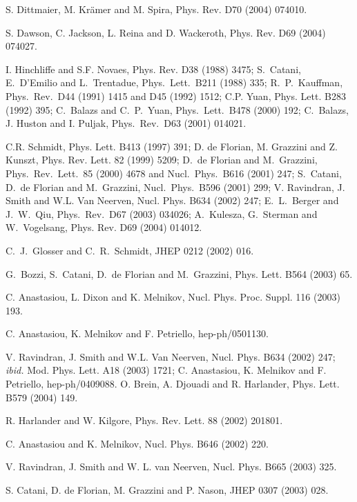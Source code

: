 \begin{thebibliography}{999}
 S. Dittmaier, M. Kr\"amer and M. Spira, Phys. Rev. D70 
(2004) 074010. 

 S. Dawson, C. Jackson, L. Reina and D. Wackeroth, Phys. Rev. 
D69 (2004) 074027.

I. Hinchliffe and S.F. Novaes, Phys. Rev. D38 (1988) 3475; 
S.~Catani, E.~D'Emilio and L.~Trentadue, Phys.\ Lett.\ B211 (1988) 335; 
R.~P.~Kauffman, Phys.\ Rev.\ D44 (1991) 1415 and D45 (1992) 1512;
C.P. Yuan, Phys. Lett. B283 (1992) 395; 
C.~Balazs and C.~P.~Yuan, Phys.\ Lett.\ B478 (2000) 192;
C.~Balazs, J. Huston and I. Puljak, Phys.\ Rev.\ D63 (2001) 014021.

 C.R. Schmidt, Phys. Lett. B413 (1997) 391; 
D. de Florian, M. Grazzini and Z. Kunszt, Phys. Rev. Lett. 82 (1999) 5209; 
D.~de Florian and M.~Grazzini, Phys.\ Rev.\ Lett.\ 85 (2000) 4678 and 
Nucl.\ Phys.\ B616 (2001) 247; S.~Catani, D.~de Florian and M.~Grazzini,
Nucl.\ Phys.\ B596 (2001) 299; V. Ravindran, J. Smith and W.L. Van Neerven, 
Nucl. Phys. B634 (2002) 247; E.~L.~Berger and J.~W.~Qiu, Phys.\ Rev.\ D67 
(2003) 034026; A.~Kulesza, G.~Sterman and W.~Vogelsang, Phys. Rev. D69 (2004) 
014012.

C.~J.~Glosser and C.~R.~Schmidt, JHEP 0212 (2002) 016.

G.~Bozzi, S.~Catani, D.~de Florian and M.~Grazzini, Phys. Lett. B564 (2003) 65.

C. Anastasiou, L. Dixon and  K. Melnikov, Nucl. Phys. Proc. Suppl. 116 (2003)
193.

C. Anastasiou,  K. Melnikov and F. Petriello, hep-ph/0501130.

 V. Ravindran, J. Smith and W.L. Van Neerven, 
Nucl. Phys. B634 (2002) 247; {\it ibid.} Mod. Phys. Lett. A18 (2003) 1721; 
C. Anastasiou,  K. Melnikov and F. Petriello, hep-ph/0409088.
 O. Brein, A. Djouadi and R. Harlander, Phys. Lett. B579 
(2004) 149.

 R. Harlander and W. Kilgore, Phys. Rev. Lett. 88 (2002)
201801.

 C. Anastasiou and K. Melnikov, Nucl. Phys. B646 (2002) 220.

 V. Ravindran, J. Smith and W. L. van Neerven, 
Nucl. Phys. B665 (2003) 325. 

 S. Catani, D. de Florian, M. Grazzini and P. Nason, 
JHEP 0307 (2003) 028.


\end{thebibliography}
